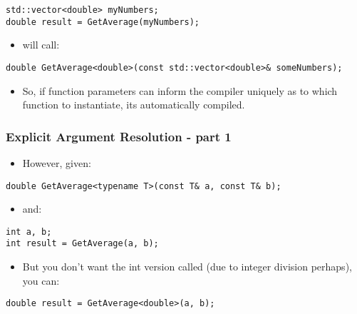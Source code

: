 \begin{verbatim}
std::vector<double> myNumbers;
double result = GetAverage(myNumbers);
\end{verbatim}

\begin{itemize}
\itemsep1pt\parskip0pt
\item
  will call:
\end{itemize}

\begin{verbatim}
double GetAverage<double>(const std::vector<double>& someNumbers);
\end{verbatim}

\begin{itemize}
\itemsep1pt\parskip0pt
\item
  So, if function parameters can inform the compiler uniquely as to
  which function to instantiate, its automatically compiled.
\end{itemize}

\subsubsection{Explicit Argument Resolution - part
1}\label{explicit-argument-resolution---part-1}

\begin{itemize}
\itemsep1pt\parskip0pt
\item
  However, given:
\end{itemize}

\begin{verbatim}
double GetAverage<typename T>(const T& a, const T& b);
\end{verbatim}

\begin{itemize}
\itemsep1pt\parskip0pt
\item
  and:
\end{itemize}

\begin{verbatim}
int a, b;
int result = GetAverage(a, b);
\end{verbatim}

\begin{itemize}
\itemsep1pt\parskip0pt
\item
  But you don't want the int version called (due to integer division
  perhaps), you can:
\end{itemize}

\begin{verbatim}
double result = GetAverage<double>(a, b);
\end{verbatim}


